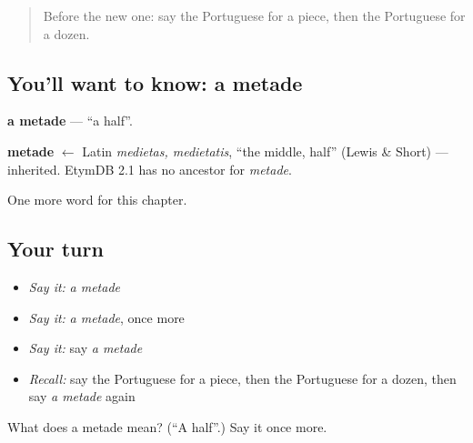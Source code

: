 \begin{quote}
Before the new one: say the Portuguese for a piece, then the Portuguese for a dozen.
\end{quote}

\subsection*{You'll want to know: a metade}
\textbf{a metade} — \textquotedblleft{}a half\textquotedblright{}.

\begin{cousinweb}
\textbf{metade} $\leftarrow$ Latin \emph{medietas, medietatis}, \textquotedblleft{}the middle, half\textquotedblright{} (Lewis \& Short) — inherited. EtymDB 2.1 has no ancestor for \emph{metade}.
\end{cousinweb}

\begin{grammarlens}[title={What you've built}]
One more word for this chapter.
\end{grammarlens}

\subsection*{Your turn}
\begin{itemize}
\raggedright
  \item \emph{Say it:} \emph{a metade}
  \item \emph{Say it:} \emph{a metade}, once more
  \item \emph{Say it:} say \emph{a metade}
  \item \emph{Recall:} say the Portuguese for a piece, then the Portuguese for a dozen, then say \emph{a metade} again
\end{itemize}

\begin{tcolorbox}[breakable,colback=teal!4,colframe=teal!35!black,title={Before you move on}]
What does a metade mean? (\textquotedblleft{}A half\textquotedblright{}.) Say it once more.
\end{tcolorbox}
